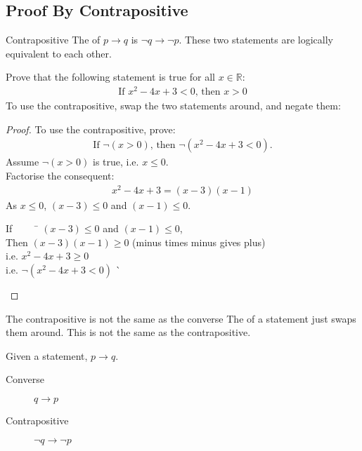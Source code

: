 \documentclass[../notes.tex]{subfiles}
\begin{document}
			\subsection{Proof By Contrapositive}
				\begin{definition}{Contrapositive}
					The  of $p \rightarrow q$ is $\lnot q \rightarrow \lnot p$. These two statements are logically equivalent to each other.
				\end{definition}
				\begin{example}
					Prove that the following statement is true for all $x \in \mathbb{R}$:
					\begin{align*}
						\text{If } x^{2} - 4x + 3 < 0 \text{, then } x > 0
					\end{align*}
					To use the contrapositive, swap the two statements around, and negate them:
					\begin{proof}
						To use the contrapositive, prove:
						\begin{align*}
							\text{If } \lnot(x > 0) \text{, then } \lnot(x^{2} - 4x + 3 < 0).
						\end{align*}
						Assume $\lnot (x > 0)$ is true, i.e. $x \leq 0$.\\
						Factorise the consequent:
						\begin{align*}
							x^{2} - 4x + 3 = (x - 3)(x - 1)
						\end{align*}
						As $x \leq 0$, $(x - 3) \leq 0$ and $(x - 1) \leq 0$.
						\begin{tabbing}
							If $\qquad$ \= $(x - 3) \leq 0$ and $(x - 1) \leq 0$,\\
							Then \> $(x - 3)(x - 1) \geq 0$ (minus times minus gives plus)\\
							i.e. \> $x^{2} - 4x + 3 \geq 0$\\
							i.e. \> $\lnot (x^{2} - 4x + 3 < 0)$ \` \qedhere
						\end{tabbing}
					\end{proof}
				\end{example}
				\begin{sidenote}{The contrapositive is not the same as the converse}
					The  of a statement just swaps them around. This is not the same as the contrapositive.
					\begin{example}
						Given a statement, $p \rightarrow q$.
						\begin{description}
							\item[Converse] $q \rightarrow p$
							\item[Contrapositive] $\lnot q \rightarrow \lnot p$ 
						\end{description} 
					\end{example}
				\end{sidenote}
\end{document}
